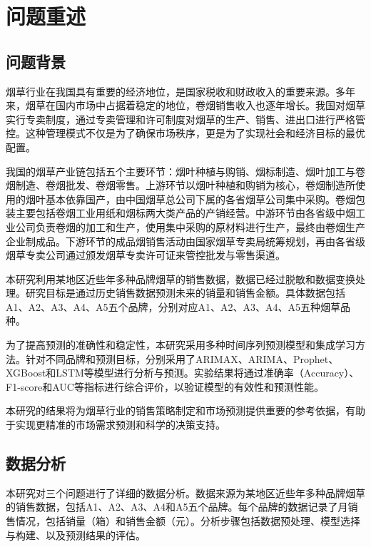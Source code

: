 \documentclass[a4paper]{article}
\begin{document}
	\tableofcontents  
	\newpage 
	
	\pagestyle{mainmatter}
	\setcounter{page}{1}
	\section{问题重述}
	\subsection{问题背景}
	
		烟草行业在我国具有重要的经济地位，是国家税收和财政收入的重要来源。多年来，烟草在国内市场中占据着稳定的地位，卷烟销售收入也逐年增长。我国对烟草实行专卖制度，通过专卖管理和许可制度对烟草的生产、销售、进出口进行严格管控。这种管理模式不仅是为了确保市场秩序，更是为了实现社会和经济目标的最优配置。

		我国的烟草产业链包括五个主要环节：烟叶种植与购销、烟标制造、烟叶加工与卷烟制造、卷烟批发、卷烟零售。上游环节以烟叶种植和购销为核心，卷烟制造所使用的烟叶基本依靠国产，由中国烟草总公司下属的各省烟草公司集中采购。卷烟包装主要包括卷烟工业用纸和烟标两大类产品的产销经营。中游环节由各省级中烟工业公司负责卷烟的加工和生产，使用集中采购的原材料进行生产，最终由卷烟生产企业制成品。下游环节的成品烟销售活动由国家烟草专卖局统筹规划，再由各省级烟草专卖公司通过颁发烟草专卖许可证来管控批发与零售渠道。

		本研究利用某地区近些年多种品牌烟草的销售数据，数据已经过脱敏和数据变换处理。研究目标是通过历史销售数据预测未来的销量和销售金额。具体数据包括A1、A2、A3、A4、A5五个品牌，分别对应A1、A2、A3、A4、A5五种烟草品种。

		为了提高预测的准确性和稳定性，本研究采用多种时间序列预测模型和集成学习方法。针对不同品牌和预测目标，分别采用了ARIMAX、ARIMA、Prophet、XGBoost和LSTM等模型进行分析与预测。实验结果将通过准确率（Accuracy）、F1-score和AUC等指标进行综合评价，以验证模型的有效性和预测性能。

		本研究的结果将为烟草行业的销售策略制定和市场预测提供重要的参考依据，有助于实现更精准的市场需求预测和科学的决策支持。

	\subsection{数据分析}

	本研究对三个问题进行了详细的数据分析。数据来源为某地区近些年多种品牌烟草的销售数据，包括A1、A2、A3、A4和A5五个品牌。每个品牌的数据记录了月销售情况，包括销量（箱）和销售金额（元）。分析步骤包括数据预处理、模型选择与构建、以及预测结果的评估。
	
\end{document}
